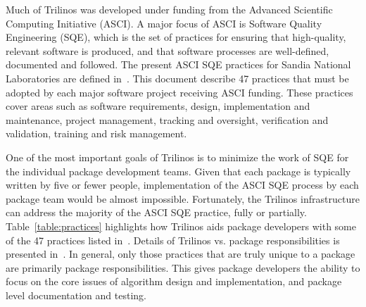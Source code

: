 \documentclass[12pt,relax]{TPA}
\begin{document}
Much of Trilinos was developed under funding from the Advanced
Scientific Computing Initiative (ASCI).  A major focus of ASCI is
Software Quality Engineering (SQE), which is the set of practices for
ensuring that
high-quality, relevant software is produced, and that software
processes are well-defined, documented and followed.  The present ASCI
SQE practices for Sandia National Laboratories are defined
in~\cite{ASCISQE2003}.  This document describe 47 practices that must
be adopted by each major software project receiving ASCI funding.
These practices cover areas such as software requirements, design,
implementation and maintenance, project management, tracking and
oversight, verification and validation, training and risk management. 

One of the most important goals of Trilinos is to minimize the work
of SQE for the individual package development teams.  Given
that each package is typically written by five or fewer people,
implementation of the ASCI SQE process by each package team would be
almost impossible.  Fortunately, the Trilinos infrastructure
can address the majority of the ASCI SQE practice, fully or
partially.  Table~\ref{table:practices} highlights how Trilinos aids
package developers with some of the 47 practices listed in~\cite{ASCISQE2003}.
Details of Trilinos vs. package responsibilities is presented 
in~\cite{Trilinos-Dev-Guide-II}.   In general, only those practices that are truly
unique to a package are primarily package responsibilities.  This gives
package developers the ability to focus on the core issues of
algorithm design and implementation, and package level documentation
and testing.
\end{document}
